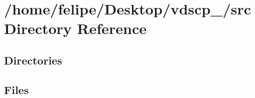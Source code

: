 \section{/home/felipe/\+Desktop/vdscp\+\_/src Directory Reference}
\label{dir_68267d1309a1af8e8297ef4c3efbcdba}
\subsection*{Directories}
\begin{DoxyCompactItemize}
\end{DoxyCompactItemize}
\subsection*{Files}
\begin{DoxyCompactItemize}
\end{DoxyCompactItemize}
